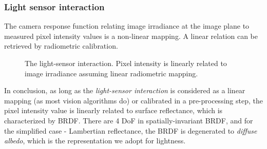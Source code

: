 \subsubsection{Light sensor interaction}
The camera response function relating image irradiance at the image plane to measured pixel intensity values is a non-linear mapping. A linear relation can be retrieved by radiometric calibration.
\begin{figure}[!ht]
\centering
{}
\caption{The light-sensor interaction. Pixel intensity is linearly related to image irradiance assuming linear radiometric mapping.}
\label{fig:light_sensor_interact}
\end{figure}

In conclusion, as long as the \textit{light-sensor interaction} is considered as a linear mapping (as most vision algorithms do) or calibrated in a pre-processing step, the pixel intensity value is linearly related to surface reflectance, which is characterized by BRDF. There are 4 DoF in spatially-invariant BRDF, and for the simplified case - Lambertian reflectance, the BRDF is degenerated to \textit{diffuse albedo}, which is the representation we adopt for lightness.


